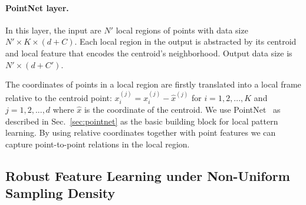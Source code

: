 


\vspace{-0.3cm}
\paragraph{PointNet layer.}
In this layer, the input are $N'$ local regions of points with data size $N' \times K \times (d+C)$. Each local region in the output is abstracted by its centroid and local feature that encodes the centroid's neighborhood. Output data size is $N' \times (d+C')$.

The coordinates of points in a local region are firstly translated into a local frame relative to the centroid point: $x_{i}^{(j)} = x_{i}^{(j)} - \hat{x}^{(j)}$ for $i = 1,2,...,K$ and $j = 1,2,...,d$ where $\hat{x}$ is the coordinate of the centroid. We use PointNet~\cite{qi2016pointnet} as described in Sec.~\ref{sec:pointnet} as the basic building block for local pattern learning. By using relative coordinates together with point features we can capture point-to-point relations in the local region.


\vspace{-0.3cm}
\subsection{Robust Feature Learning under Non-Uniform Sampling Density}
\label{sec:pointnet2++}

